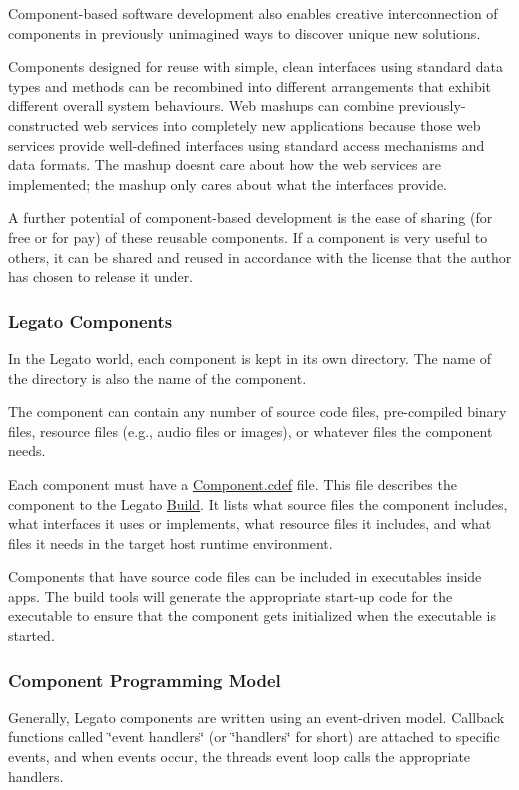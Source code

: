 Component-\/based software development also enables creative interconnection of components in previously unimagined ways to discover unique new solutions.

Components designed for reuse with simple, clean interfaces using standard data types and methods can be recombined into different arrangements that exhibit different overall system behaviours. Web mashups can combine previously-\/constructed web services into completely new applications because those web services provide well-\/defined interfaces using standard access mechanisms and data formats. The mashup doesn\textquotesingle{}t care about how the web services are implemented; the mashup only cares about what the interfaces provide.

A further potential of component-\/based development is the ease of sharing (for free or for pay) of these reusable components. If a component is very useful to others, it can be shared and reused in accordance with the license that the author has chosen to release it under.\hypertarget{basic_components_basicComponentsLegato}{}\subsubsection{Legato Components}\label{basic_components_basicComponentsLegato}
In the Legato world, each component is kept in its own directory. The name of the directory is also the name of the component.

The component can contain any number of source code files, pre-\/compiled binary files, resource files (e.\+g., audio files or images), or whatever files the component needs.

Each component must have a {\ttfamily  \hyperlink{defFilesCdef}{Component.cdef} } file. This file describes the component to the Legato \hyperlink{buildTools}{Build}. It lists what source files the component includes, what interfaces it uses or implements, what resource files it includes, and what files it needs in the target host runtime environment.

Components that have source code files can be included in executables inside apps. The build tools will generate the appropriate start-\/up code for the executable to ensure that the component gets initialized when the executable is started.\hypertarget{basic_components_basicComponentsProgrammingModel}{}\subsubsection{Component Programming Model}\label{basic_components_basicComponentsProgrammingModel}
Generally, Legato components are written using an event-\/driven model. Callback functions called \char`\"{}event handlers\char`\"{} (or \char`\"{}handlers\char`\"{} for short) are attached to specific events, and when events occur, the thread\textquotesingle{}s event loop calls the appropriate handlers.

